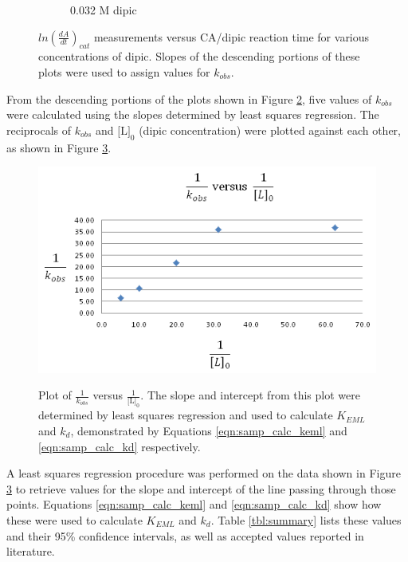 \begin{figure}[h]
\begin{subfigure}{0.5\textwidth}
                \caption{0.032 M dipic}
                \label{fig:0.032M_dipic_readings}
        \end{subfigure}
        \caption{$ln \left(\frac{dA}{dt}\right)_{cat}$ measurements versus CA/dipic reaction time for various concentrations of dipic. Slopes of the descending portions of these plots were used to assign values for $k_{obs}$.}\label{fig:kobs_results}
\end{figure}

From the descending portions of the plots shown in Figure \ref{fig:kobs_results}, five values of $k_{obs}$ were calculated using the slopes determined by least squares regression. The reciprocals of $k_{obs}$ and $\text{[L]}_0$ (dipic concentration) were plotted against each other, as shown in Figure \ref{fig:kobs_vs_l}.

\begin{figure}[h]
  \includegraphics[scale=.5]{./Figures/kobs_vs_l.png}\\
  \caption{Plot of $\frac{1}{k_{obs}}$ versus $\frac{1}{\text{[L]}_0}$. The slope and intercept from this plot were determined by least squares regression and used to calculate $K_{EML}$ and $k_d$, demonstrated by Equations \eqref{eqn:samp_calc_keml} and \eqref{eqn:samp_calc_kd} respectively.}\label{fig:kobs_vs_l}
\end{figure}

A least squares regression procedure was performed on the data shown in Figure \ref{fig:kobs_vs_l} to retrieve values for the slope and intercept of the line passing through those points. Equations \eqref{eqn:samp_calc_keml} and \eqref{eqn:samp_calc_kd} show how these were used to calculate $K_{EML}$ and $k_d$. Table \ref{tbl:summary} lists these values and their 95\% confidence intervals, as well as accepted values reported in literature.

